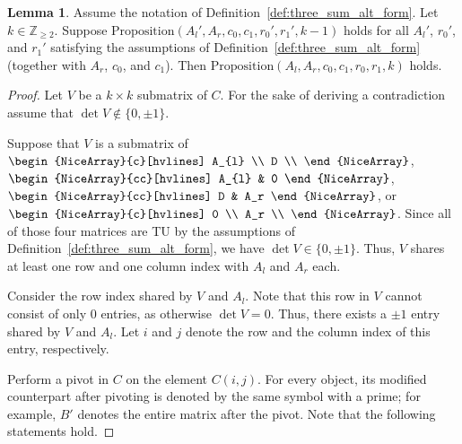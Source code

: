 \documentclass{article}
\theoremstyle{definition}
\newtheorem{lemma}[theorem]{Lemma}
\begin{document}
\begin{lemma}\label{lem:three_sum_alt_form_k_TU_induction}
    Assume the notation of Definition~\ref{def:three_sum_alt_form}. Let $k \in \mathbb{Z}_{\geq 2}$. Suppose $\mathrm{Proposition}(A_{l}', A_{r}, c_{0}, c_{1}, r_{0}', r_{1}', k - 1)$ holds for all $A_{l}'$, $r_{0}'$, and $r_{1}'$ satisfying the assumptions of Definition~\ref{def:three_sum_alt_form} (together with $A_{r}$, $c_{0}$, and $c_{1}$). Then $\mathrm{Proposition}(A_{l}, A_{r}, c_{0}, c_{1}, r_{0}, r_{1}, k)$ holds.
\end{lemma}

\begin{proof}
    Let $V$ be a $k \times k$ submatrix of $C$. For the sake of deriving a contradiction assume that $\det V \notin \{0, \pm 1\}$.

    Suppose that $V$ is a submatrix of $\begin{NiceArray}{c}[hvlines] A_{l} \\ D \\ \end{NiceArray}$, $\begin{NiceArray}{cc}[hvlines] A_{l} & 0 \end{NiceArray}$, $\begin{NiceArray}{cc}[hvlines] D & A_r \end{NiceArray}$, or $\begin{NiceArray}{c}[hvlines] 0 \\ A_r \\ \end{NiceArray}$. Since all of those four matrices are TU by the assumptions of Definition~\ref{def:three_sum_alt_form}, we have $\det V \in \{0, \pm 1\}$. Thus, $V$ shares at least one row and one column index with $A_{l}$ and $A_{r}$ each.

    Consider the row index shared by $V$ and $A_{l}$. Note that this row in $V$ cannot consist of only $0$ entries, as otherwise $\det V = 0$. Thus, there exists a $\pm 1$ entry shared by $V$ and $A_{l}$. Let $i$ and $j$ denote the row and the column index of this entry, respectively.

    Perform a pivot in $C$ on the element $C (i, j)$. For every object, its modified counterpart after pivoting is denoted by the same symbol with a prime; for example, $B'$ denotes the entire matrix after the pivot. Note that the following statements hold.


\end{proof}
\end{document}
